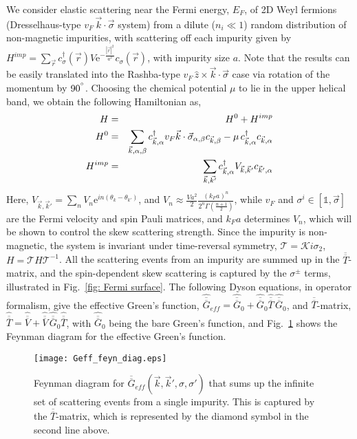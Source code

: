 \documentclass[twocolumn,epsfig,a4paper,amsmath,amssymb,showpacs,prl,superscriptaddress]{revtex4-1}
\newcommand{\ba}{\begin{eqnarray}}
\newcommand{\ea}{\end{eqnarray}}
\newcommand{\dg}{^{\dagger}}
\newcommand{\mI}{{\mathbb 1}}
\newcommand{\me}{\mathrm{e}}
\newcommand{\Vbar}{\overline{\overline{V}}}
\newcommand{\Gbar}{\overline{\overline{G}}}
\newcommand{\Tbar}{\overline{\overline{T}}}
\begin{document}
We consider elastic scattering near the Fermi energy, $E_F$, of 2D Weyl fermions (Dresselhaus-type $v_F \, \vec{k} \cdot \vec{\sigma}$ system) from a dilute ($n_i \ll 1$) random distribution of non-magnetic impurities, with scattering off each impurity given by $H^{imp} = \sum_{\vec{r}} c\dg_{\sigma}(\vec{r}) V \mathrm{e}^{-\frac{|\vec{r}|^2}{a^2}} c_{\sigma}(\vec{r})$, with impurity size $a$. Note that the results can be easily translated into the Rashba-type $v_F \, \hat{z} \times \vec{k} \cdot \vec{\sigma}$ case via rotation of the momentum by $90^{\degree}$. Choosing the chemical potential $\mu$ to lie in the upper helical band, we obtain the following Hamiltonian as,
%
\ba
\label{eqn: Hamiltonian}
H & = & H^0 + H^{imp} \\
H^0 & = & \sum_{\vec{k}, \alpha, \beta} c\dg_{\vec{k}, \alpha}  v_F  \vec{k} \cdot \vec{\sigma}_{\alpha, \beta} c_{\vec{k}, \beta} - \mu \, c\dg_{\vec{k}, \alpha} c_{\vec{k}, \alpha} \cr
H^{imp} & = & \sum_{\vec{k}, \vec{k'}} c\dg_{\vec{k}, \alpha} V_{\vec{k}, \vec{k}'} c_{\vec{k}', \alpha} 
\ea
%
Here, $V_{\vec{k}, \vec{k}'} = \sum_n V_n \me^{i n (\theta_{k} - \theta_{k'})}$, and $V_n \approx \tfrac{V a^2}{2} \frac{(k_F a)^n}{2^n \Gamma(\tfrac{n+1}{2})}$, while $v_F$ and $\sigma^i \in [\mI, \vec{\sigma}]$ are the Fermi velocity and spin Pauli matrices, and $k_F a$ determines $V_n$, which will be shown to control the skew scattering strength. Since the impurity is non-magnetic, the system is invariant under time-reversal symmetry, $\mathcal{T} = \mathcal{K} i \sigma_2$, $H= \mathcal{T} H \mathcal{T}^{-1}$. All the scattering events from an impurity are summed up in the $\Tbar$-matrix, and the spin-dependent skew scattering is captured by the $\sigma^{\pm}$ terms, illustrated in Fig.~\ref{fig: Fermi surface}. The following Dyson equations, in operator formalism, give the effective Green's function, $\hat{\Gbar}_{eff} = \hat{\Gbar}_0 + \hat{\Gbar}_0 \hat{\Tbar} \, \hat{\Gbar}_0$, and $\Tbar$-matrix, $\hat{\Tbar} = \hat{\Vbar} + \hat{\Vbar} \, \hat{\Gbar}_0 \hat{\Tbar}$, with $\hat{\Gbar}_0$ being the bare Green's function, and Fig.~\ref{fig: Geff Feyn diag} shows the Feynman diagram for the effective Green's function.
%
\begin{figure}[bht!]
\begin{center}
\texttt{[image: Geff\_feyn\_diag.eps]}
\end{center}
\captionsetup{justification=RaggedRight, singlelinecheck=false}
\caption{\label{fig: Geff Feyn diag} 
Feynman diagram for  $\Gbar_{eff}(\vec{k}, \vec{k}', \sigma, \sigma')$ that sums up the infinite set of scattering events from a single impurity. This is captured by the $\Tbar$-matrix, which is represented by the diamond symbol in the second line above.}
\end{figure}
\end{document}
